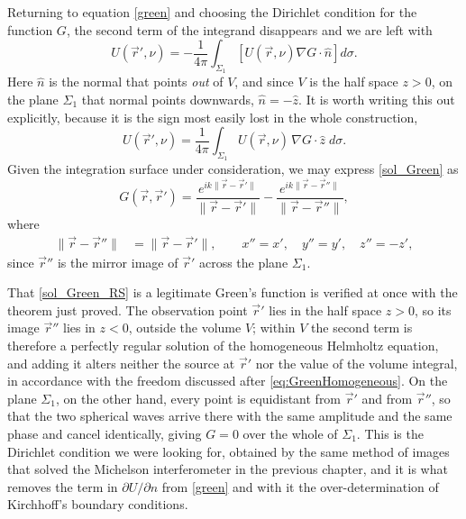 		Returning to equation \eqref{green} and choosing the Dirichlet condition for the function $G$, the second term of the integrand disappears and we are left with
		\begin{equation}
			\label{psi_expr}
			U(\vec{r}', \nu) = -\frac{1}{4\pi} \int_{\Sigma_1} \left[U(\vec{r}, \nu) \nabla G \cdot\hat{n}\right] d\sigma .
		\end{equation}
		Here $\hat{n}$ is the normal that points \textit{out} of $V$, and since $V$ is the half space $z>0$, on the plane $\Sigma_{1}$ that normal points downwards, $\hat{n} = -\hat{z}$. It is worth writing this out explicitly, because it is the sign most easily lost in the whole construction,
		\begin{equation}\label{eq:RSnormal}
			U(\vec{r}', \nu) = \frac{1}{4\pi} \int_{\Sigma_1} U(\vec{r}, \nu)\,\nabla G \cdot\hat{z}\; d\sigma .
		\end{equation}
		Given the integration surface under consideration, we may express \eqref{sol_Green} as
		\begin{equation}
			\label{sol_Green_RS}
			G(\vec{r}, \vec{r}') = \frac{e^{ik\|\vec{r} - \vec{r}'\|}}{\|\vec{r} - \vec{r}'\|} - \frac{e^{ik\|\vec{r} - \vec{r}''\|}}{\|\vec{r} - \vec{r}''\|},
		\end{equation}
		\noindent where
		\begin{align}
			\|\vec{r} - \vec{r}''\| &= \|\vec{r} - \vec{r}'\|, \qquad x'' = x', \quad y'' = y', \quad z'' = -z',
		\end{align}
		since $\vec{r}''$ is the mirror image of $\vec{r}'$ across the plane $\Sigma_1$.

		That \eqref{sol_Green_RS} is a legitimate Green's function is verified at once with the theorem just proved. The observation point $\vec{r}'$ lies in the half space $z>0$, so its image $\vec{r}''$ lies in $z<0$, outside the volume $V$; within $V$ the second term is therefore a perfectly regular solution of the homogeneous Helmholtz equation, and adding it alters neither the source at $\vec{r}'$ nor the value of the volume integral, in accordance with the freedom discussed after \eqref{eq:GreenHomogeneous}. On the plane $\Sigma_{1}$, on the other hand, every point is equidistant from $\vec{r}'$ and from $\vec{r}''$, so that the two spherical waves arrive there with the same amplitude and the same phase and cancel identically, giving $G = 0$ over the whole of $\Sigma_{1}$. This is the Dirichlet condition we were looking for, obtained by the same method of images that solved the Michelson interferometer in the previous chapter, and it is what removes the term in $\partial U/\partial n$ from \eqref{green} and with it the over-determination of Kirchhoff's boundary conditions.

